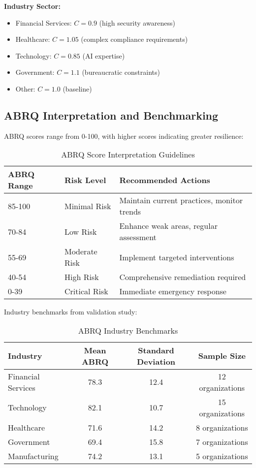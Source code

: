 \documentclass[11pt,a4paper]{article}
\begin{document}
\textbf{Industry Sector:}
\begin{itemize}
\item Financial Services: $C = 0.9$ (high security awareness)
\item Healthcare: $C = 1.05$ (complex compliance requirements)
\item Technology: $C = 0.85$ (AI expertise)
\item Government: $C = 1.1$ (bureaucratic constraints)
\item Other: $C = 1.0$ (baseline)
\end{itemize}

\subsection{ABRQ Interpretation and Benchmarking}

ABRQ scores range from 0-100, with higher scores indicating greater resilience:

\begin{table}[H]
\centering
\caption{ABRQ Score Interpretation Guidelines}
\label{tab:abrq_interpretation}
\begin{tabular}{lll}
\toprule
ABRQ Range & Risk Level & Recommended Actions \\
\midrule
85-100 & Minimal Risk & Maintain current practices, monitor trends \\
70-84 & Low Risk & Enhance weak areas, regular assessment \\
55-69 & Moderate Risk & Implement targeted interventions \\
40-54 & High Risk & Comprehensive remediation required \\
0-39 & Critical Risk & Immediate emergency response \\
\bottomrule
\end{tabular}
\end{table}

Industry benchmarks from validation study:

\begin{table}[H]
\centering
\caption{ABRQ Industry Benchmarks}
\label{tab:industry_benchmarks}
\begin{tabular}{lccc}
\toprule
Industry & Mean ABRQ & Standard Deviation & Sample Size \\
\midrule
Financial Services & 78.3 & 12.4 & 12 organizations \\
Technology & 82.1 & 10.7 & 15 organizations \\
Healthcare & 71.6 & 14.2 & 8 organizations \\
Government & 69.4 & 15.8 & 7 organizations \\
Manufacturing & 74.2 & 13.1 & 5 organizations \\
\bottomrule
\end{tabular}
\end{table}
\end{document}
